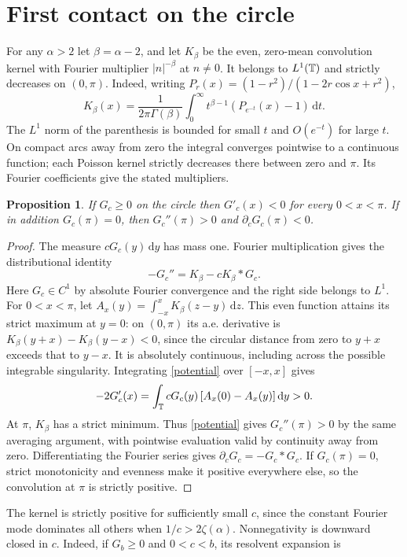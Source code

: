 \documentclass[11pt]{article}
\theoremstyle{plain}\newtheorem{theorem}{Theorem}[section]\newtheorem{lemma}[theorem]{Lemma}\newtheorem{corollary}[theorem]{Corollary}\newtheorem{proposition}[theorem]{Proposition}
\newcommand{\dd}{\,\mathrm d}
\numberwithin{equation}{section}
\begin{document}
\section{First contact on the circle}\label{sec:arc}
For any $\alpha>2$ let $\beta=\alpha-2$, and let $K_\beta$ be the even, zero-mean convolution kernel with Fourier multiplier $|n|^{-\beta}$ at $n\ne0$. It belongs to $L^1(\mathbb T)$ and strictly decreases on $(0,\pi)$. Indeed, writing $P_r(x)=(1-r^2)/(1-2r\cos x+r^2)$,
\[
 K_\beta(x)=\frac{1}{2\pi\Gamma(\beta)}\int_0^\infty
       t^{\beta-1}(P_{e^{-t}}(x)-1)\dd t .
\]
The $L^1$ norm of the parenthesis is bounded for small $t$ and $O(e^{-t})$ for large $t$. On compact arcs away from zero the integral converges pointwise to a continuous function; each Poisson kernel strictly decreases there between zero and $\pi$. Its Fourier coefficients give the stated multipliers.
\begin{proposition}\label{arc}
If $G_c\ge0$ on the circle then $G'_c(x)<0$ for every $0<x<\pi$. If in addition $G_c(\pi)=0$, then $G_c''(\pi)>0$ and $\partial_cG_c(\pi)<0$.
\end{proposition}
\begin{proof}
The measure $cG_c(y)\dd y$ has mass one. Fourier multiplication gives the distributional identity
\begin{equation}\label{potential}
                -G_c''=K_\beta-c K_\beta*G_c .
\end{equation}
Here $G_c\in C^1$ by absolute Fourier convergence and the right side belongs to $L^1$. For $0<x<\pi$, let $A_x(y)=\int_{-x}^x K_\beta(z-y)\dd z$. This even function attains its strict maximum at $y=0$: on $(0,\pi)$ its a.e. derivative is $K_\beta(y+x)-K_\beta(y-x)<0$, since the circular distance from zero to $y+x$ exceeds that to $y-x$. It is absolutely continuous, including across the possible integrable singularity. Integrating \eqref{potential} over $[-x,x]$ gives
\[
      -2G_c'(x)=\int_{\T} cG_c(y)\,[A_x(0)-A_x(y)]\dd y>0 .
\]
At $\pi$, $K_\beta$ has a strict minimum. Thus \eqref{potential} gives $G_c''(\pi)>0$ by the same averaging argument, with pointwise evaluation valid by continuity away from zero. Differentiating the Fourier series gives $\partial_c G_c=-G_c*G_c$. If $G_c(\pi)=0$, strict monotonicity and evenness make it positive everywhere else, so the convolution at $\pi$ is strictly positive.
\end{proof}
The kernel is strictly positive for sufficiently small $c$, since the constant Fourier mode dominates all others when $1/c>2\zeta(\alpha)$. Nonnegativity is downward closed in $c$. Indeed, if $G_b\ge0$ and $0<c<b$, its resolvent expansion is
\end{document}
